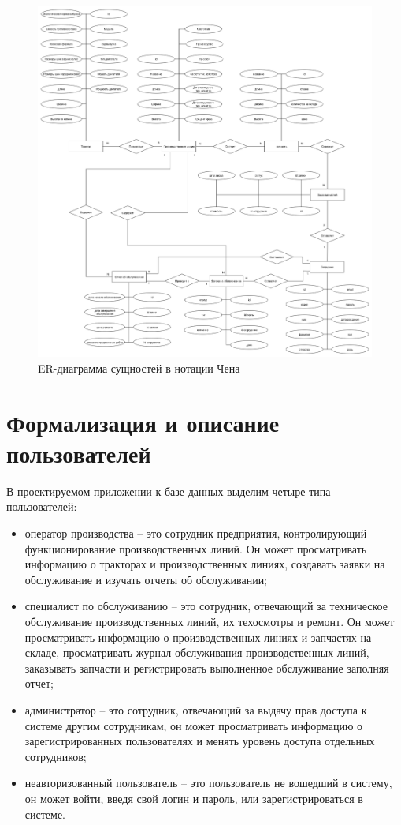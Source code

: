 \begin{figure}[H]
    \centering
    \includegraphics[width=1\textwidth]{templates/coursework/inc/img/erchena.png}
    \caption{ER-диаграмма сущностей в нотации Чена}
    \label{img:er}
\end{figure}

\section{Формализация и описание пользователей}

В проектируемом приложении к базе данных выделим четыре типа пользователей:

\begin{itemize}[label=--]
    \item оператор производства -- это сотрудник предприятия, контролирующий функционирование производственных линий. Он может просматривать информацию о тракторах и производственных линиях, создавать заявки на обслуживание и изучать отчеты об обслуживании;
    \item специалист по обслуживанию -- это сотрудник, отвечающий за техническое обслуживание производственных линий, их техосмотры и ремонт. Он может просматривать информацию о производственных линиях и запчастях на складе, просматривать журнал обслуживания производственных линий, заказывать запчасти и регистрировать выполненное обслуживание заполняя отчет;
    \item администратор -- это сотрудник, отвечающий за выдачу прав доступа к системе другим сотрудникам, он может просматривать информацию о зарегистрированных пользователях и менять уровень доступа отдельных сотрудников;
    \item неавторизованный пользователь -- это пользователь не вошедший в систему, он может войти, введя свой логин и пароль, или зарегистрироваться в системе.
\end{itemize}

